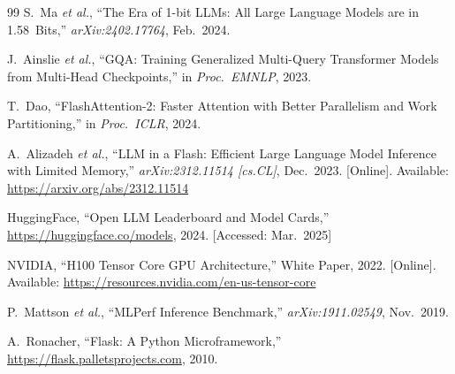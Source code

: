 \documentclass[journal]{IEEEtran}
\begin{document}
\begin{thebibliography}{99}
S.~Ma \textit{et al.}, ``The Era of 1-bit LLMs: All Large Language
Models are in 1.58~Bits,'' \textit{arXiv:2402.17764}, Feb.\ 2024.

J.~Ainslie \textit{et al.}, ``GQA: Training Generalized Multi-Query
Transformer Models from Multi-Head Checkpoints,''
in \textit{Proc.\ EMNLP}, 2023.

T.~Dao, ``FlashAttention-2: Faster Attention with Better Parallelism
and Work Partitioning,'' in \textit{Proc.\ ICLR}, 2024.

A.~Alizadeh \textit{et al.}, ``LLM in a Flash: Efficient Large Language
Model Inference with Limited Memory,''
\textit{arXiv:2312.11514 [cs.CL]}, Dec.\ 2023.
[Online]. Available: \url{https://arxiv.org/abs/2312.11514}

HuggingFace, ``Open LLM Leaderboard and Model Cards,''
\url{https://huggingface.co/models}, 2024.
[Accessed: Mar.\ 2025]

NVIDIA, ``H100 Tensor Core GPU Architecture,'' White Paper, 2022.
[Online]. Available: \url{https://resources.nvidia.com/en-us-tensor-core}

P.~Mattson \textit{et al.}, ``MLPerf Inference Benchmark,''
\textit{arXiv:1911.02549}, Nov.\ 2019.

A.~Ronacher, ``Flask: A Python Microframework,''
\url{https://flask.palletsprojects.com}, 2010.

\end{thebibliography}
\end{document}
